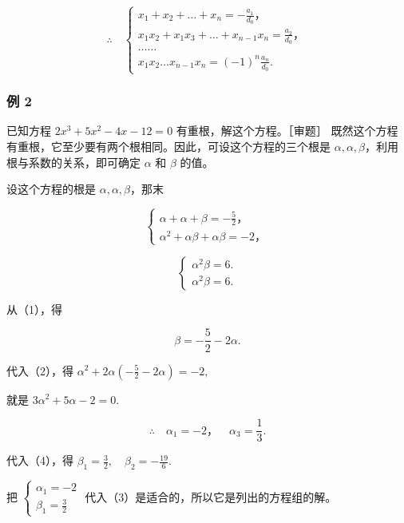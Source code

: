 \[
\therefore \quad \left\{ \begin{array}{l} x _ {1} + x _ {2} + \dots + x _ {n} = - \frac {a _ {1}}{d _ {0}}\text{，} \\ x _ {1} x _ {2} + x _ {1} x _ {3} + \dots + x _ {n - 1} x _ {n} = \frac {a _ {2}}{d _ {0}}\text{，} \\ \dots \dots \\ x _ {1} x _ {2} \dots x _ {n - 1} x _ {n} = (- 1) ^ {n} \frac {a _ {n}}{d _ {0}}. \end{array} \right.
\]

\subsubsection{例 2}

已知方程 \(2x^{3} + 5x^{2} - 4x - 12 = 0\) 有重根，解这个方程。［审题］
既然这个方程有重根，它至少要有两个根相同。因此，可设这个方程的三个根是
\(\alpha, \alpha, \beta\)，利用根与系数的关系，即可确定 \(\alpha\) 和
\(\beta\) 的值。

 设这个方程的根是 \(\alpha, \alpha, \beta\)，那末

\[
\left\{ \begin{array}{l} \alpha + \alpha + \beta = - \frac {5}{2}\text{，} \\ \alpha^ {2} + \alpha \beta + \alpha \beta = - 2\text{，} \end{array} \right. \tag {1}
\]

\[
\left\{ \begin{array}{l} \alpha^ {2} \beta = 6. \\ \alpha^ {2} \beta = 6. \end{array} \right. \tag {2}
\]

从（1），得

\[
\beta = - \frac {5}{2} - 2 \alpha . \tag {4}
\]

代入（2），得
\(\alpha^2 + 2\alpha \left(-\frac{5}{2} - 2\alpha\right) = -2,\)

就是 \(3\alpha^{2} + 5\alpha - 2 = 0.\)

\[
\therefore \quad \alpha_ {1} = - 2\text{，} \quad \alpha_ {3} = \frac {1}{3}.
\]

代入（4），得
\(\beta_{1} = \frac{3}{2},\quad \beta_{2} = -\frac{19}{6}.\)

把
\(\left\{ \begin{array}{l} \alpha_{1} = -2 \\ \beta_{1} = \frac{3}{2} \end{array} \right.\)
代入（3）是适合的，所以它是列出的方程组的解。

